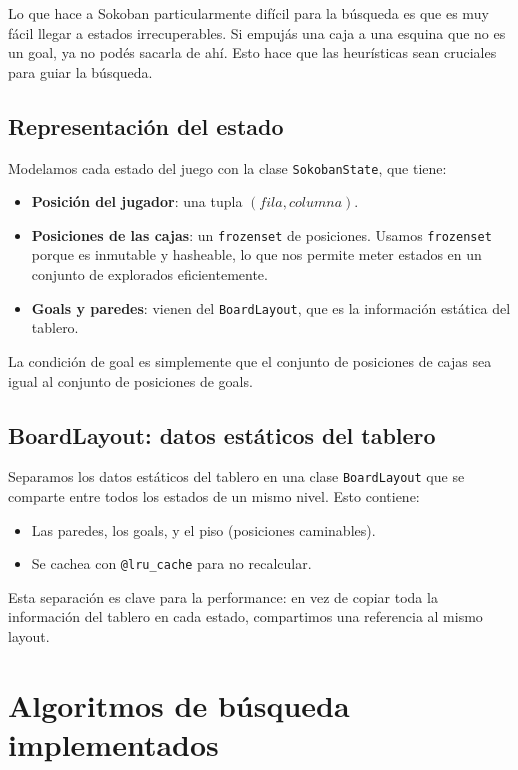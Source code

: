 \documentclass[12pt, a4paper]{article}
\begin{document}
Lo que hace a Sokoban particularmente difícil para la búsqueda es que es muy fácil llegar a estados irrecuperables. Si empujás una caja a una esquina que no es un goal, ya no podés sacarla de ahí. Esto hace que las heurísticas sean cruciales para guiar la búsqueda.

\subsection{Representación del estado}

Modelamos cada estado del juego con la clase \texttt{SokobanState}, que tiene:

\begin{itemize}
  \item \textbf{Posición del jugador}: una tupla $(fila, columna)$.
  \item \textbf{Posiciones de las cajas}: un \texttt{frozenset} de posiciones. Usamos \texttt{frozenset} porque es inmutable y hasheable, lo que nos permite meter estados en un conjunto de explorados eficientemente.
  \item \textbf{Goals y paredes}: vienen del \texttt{BoardLayout}, que es la información estática del tablero.
\end{itemize}

La condición de goal es simplemente que el conjunto de posiciones de cajas sea igual al conjunto de posiciones de goals.

\subsection{BoardLayout: datos estáticos del tablero}

Separamos los datos estáticos del tablero en una clase \texttt{BoardLayout} que se comparte entre todos los estados de un mismo nivel. Esto contiene:

\begin{itemize}
  \item Las paredes, los goals, y el piso (posiciones caminables).
  \item Se cachea con \texttt{@lru\_cache} para no recalcular.
\end{itemize}

Esta separación es clave para la performance: en vez de copiar toda la información del tablero en cada estado, compartimos una referencia al mismo layout.

\section{Algoritmos de búsqueda implementados}
\end{document}
